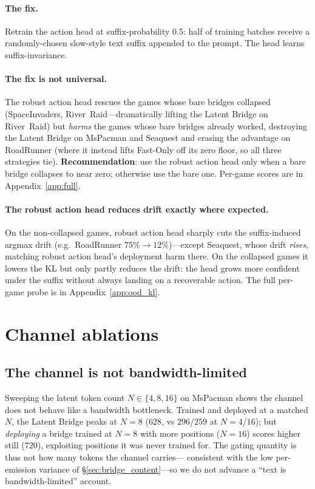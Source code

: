 \documentclass[11pt]{article}
\begin{document}
\paragraph{The fix.} Retrain the action head at suffix-probability 0.5: half of training batches receive a randomly-chosen slow-style text suffix appended to the prompt. The head learns suffix-invariance.

\paragraph{The fix is not universal.} The robust action head rescues the games whose bare bridges collapsed (SpaceInvaders, River~Raid---dramatically lifting the Latent Bridge on River~Raid) but \emph{harms} the games whose bare bridges already worked, destroying the Latent Bridge on MsPacman and Seaquest and erasing the advantage on RoadRunner (where it instead lifts Fast-Only off its zero floor, so all three strategies tie). \textbf{Recommendation}: use the robust action head only when a bare bridge collapses to near zero; otherwise use the bare one. Per-game scores are in Appendix~\ref{app:full}.

\paragraph{The robust action head reduces drift exactly where expected.} On the non-collapsed games, robust
action head sharply cuts the suffix-induced argmax drift (e.g.\ RoadRunner $75\%\!\to\!12\%$)---except
Seaquest, whose drift \emph{rises}, matching robust action head's deployment harm there. On the collapsed
games it lowers the KL but only partly reduces the drift: the head grows more confident under the
suffix without always landing on a recoverable action. The full per-game probe is in
Appendix~\ref{app:ood_kl}.

\section{Channel ablations}
\label{sec:ablations}

\subsection{The channel is not bandwidth-limited}
\label{sec:bandwidth}

Sweeping the latent token count $N\!\in\!\{4,8,16\}$ on MsPacman shows the channel does not behave like a
bandwidth bottleneck. Trained and deployed at a matched $N$, the Latent Bridge peaks at
$N\!=\!8$ ($628$, vs $296$/$259$ at $N\!=\!4$/$16$); but \emph{deploying} a bridge trained at
$N\!=\!8$ with more positions ($N\!=\!16$) scores higher still ($720$), exploiting positions it
was never trained for. The gating quantity is thus not how many tokens the channel carries---%
consistent with the low per-emission variance of \S\ref{sec:bridge_content}---so we do not
advance a ``text is bandwidth-limited'' account.
\end{document}
